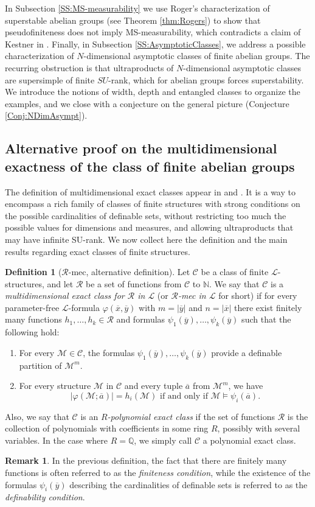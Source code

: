 \documentclass[10pt,a4paper]{amsart}
\theoremstyle{definition}
\newtheorem{rmk}[prop]{Remark}
\newtheorem{definicion}[prop]{Definition}
\newcommand{\bd}{\begin{definicion}}
\newcommand{\ed}{\end{definicion}}
\newcommand{\brmk}{\begin{rmk}}
\newcommand{\ermk}{\end{rmk}}
\newcommand{\benum}{\begin{enumerate}}
\newcommand{\eenum}{\end{enumerate}}
\newcommand{\ov}[1]{\overline{#1}}
\newcommand{\Le}{\mathcal{L}}
\begin{document}
In Subsection \ref{SS:MS-measurability} we use Roger's characterization of superstable abelian groups (see Theorem \ref{thm:Rogers}) to show that pseudofiniteness does not imply MS-measurability, which contradicts a claim of Kestner in \cite[Remark 4.14]{Kestner2014}. Finally, in Subsection \ref{SS:AsymptoticClasses}, we address a possible characterization of $N$-dimensional asymptotic classes of finite abelian groups. The recurring obstruction is that ultraproducts of $N$-dimensional asymptotic classes are supersimple of finite $SU$-rank, which for abelian groups forces superstability. We introduce the notions of width, depth and entangled classes to organize the examples, and we close with a conjecture on the general picture (Conjecture \ref{Conj:NDimAsympt}).
\subsection{Alternative proof on the multidimensional exactness of the class of finite abelian groups}\label{SS:MEC}
The definition of multidimensional exact classes appear in \cite{Wolf-MEC} and \cite{AMSW}. It is a way to encompass a rich family of classes of finite structures with strong conditions on the possible cardinalities of definable sets, without restricting too much the possible values for dimensions and measures, and allowing ultraproducts that may have infinite SU-rank. We now collect here the definition and the main results regarding exact classes of finite structures.
\bd [$\mathcal{R}$-mec, alternative definition] \label{Def:MEC} Let $\mathcal{C}$ be a class of finite $\Le$-structures, and let $\mathcal{R}$ be a set of functions from $\mathcal{C}$ to $\mathbb{N}$. We say that $\mathcal{C}$ is a \emph{multidimensional exact class for $\mathcal{R}$ in $\Le$} (or \emph{$\mathcal{R}$-mec in $\mathcal{L}$} for short) if for every parameter-free $\Le$-formula $\varphi(\ov{x},\ov{y})$ with $m=|\ov{y}|$ and $n=|\ov{x}|$ there exist finitely many functions $h_1,\ldots,h_k\in \mathcal{R}$ and formulas $\psi_1(\ov{y}),\ldots,\psi_k(\ov{y})$ such that the following hold:
\benum
\item For every $\mathcal{M}\in \mathcal{C}$, the formulas $\psi_1(\ov{y}),\ldots,\psi_k(\ov{y})$ provide a definable partition of $\mathcal{M}^m$.
\item For every structure $\mathcal{M}$ in $\mathcal{C}$ and every tuple $\ov{a}$ from $\mathcal{M}^m$, we have \[|\varphi(\mathcal{M};\ov{a})|=h_i(\mathcal{M}) \text{\ if and only if\ }\mathcal{M}\models \psi_i(\ov{a}).\]
\eenum
Also, we say that $\mathcal{C}$ is an \emph{$R$-polynomial exact class} if the set of functions $\mathcal{R}$ is the collection of polynomials with coefficients in some ring $R$, possibly with several variables. In the case where $R=\mathbb{Q}$, we simply call $\mathcal{C}$ a polynomial exact class.
\ed
\brmk In the previous definition, the fact that there are finitely many functions is often referred to as the \emph{finiteness condition}, while the existence of the formulas $\psi_i(\ov{y})$ describing the cardinalities of definable sets is referred to as the \emph{definability condition}. 
\ermk
\end{document}
